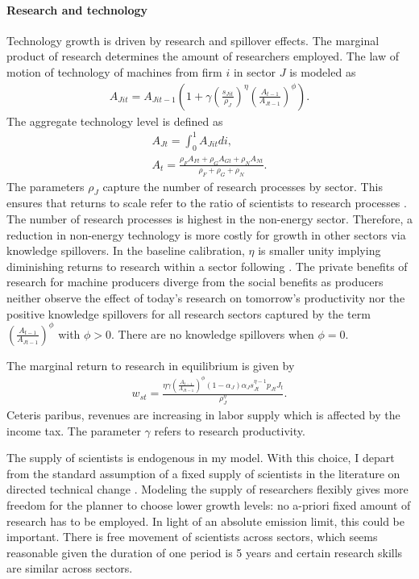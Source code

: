 \paragraph{Research and technology}
Technology growth is driven by research and spillover effects. The marginal product of research determines the amount of researchers employed.
The law of motion of technology of machines from firm $i$ in sector $J$ is modeled as
\begin{align}
A_{Jit}=A_{Jit-1}\left(1+\gamma\left(\frac{s_{Jit}}{\rho_J}\right)^\eta\left(\frac{A_{t-1}}{A_{Jt-1}}\right)^\phi\right).
\end{align}
The aggregate technology level is defined as
\begin{align}
A_{Jt}=\int_{0}^{1}A_{Jit}di,\\
A_{t}=\frac{\rho_FA_{Ft}+\rho_GA_{Gt}+\rho_N A_{Nt}}{\rho_F+\rho_G+\rho_N}.
\end{align}
The parameters $\rho_J$ capture the number of research processes by sector. This ensures that returns to scale refer to the ratio of scientists to research processes \citep{Fried2018ClimateAnalysis}. 
The number of research processes is highest in the non-energy sector. Therefore, a reduction in non-energy technology is more costly for growth in other sectors via knowledge spillovers. 
In the baseline calibration, $\eta$ is smaller unity implying diminishing returns to research within a sector following \cite{Fried2018ClimateAnalysis}. 
The private benefits of research for machine producers diverge from the social benefits as  producers neither observe the effect of today's research on tomorrow's productivity nor the positive knowledge spillovers for all research sectors captured by the term $\left(\frac{A_{t-1}}{A_{Jt-1}}\right)^\phi$ with $\phi>0$. There are no knowledge spillovers when $\phi=0$.

The marginal return to research in equilibrium is  given by
\begin{align}
w_{st}= \frac{\eta \gamma \left(\frac{A_{t-1}}{A_{Jt-1}}\right)^\phi (1-\alpha_J)\alpha_Js_{Jt}^{\eta-1}p_{Jt}J_t}{\rho_J^\eta}.
\end{align}
Ceteris paribus, revenues are increasing in labor supply which is affected by the income tax. The parameter $\gamma$ refers to research productivity.

The supply of scientists is endogenous in my model. With this choice, I depart from the standard assumption of a fixed supply of scientists in the literature on directed technical change \citep{Acemoglu2012TheChange, Fried2018ClimateAnalysis}.  Modeling the supply of researchers flexibly gives more freedom for the planner to choose lower growth levels: no a-priori fixed amount of research has to be employed. In light of an absolute emission limit, this could be important.
There is free movement of scientists across sectors, which seems reasonable given the duration of one period is 5 years and certain research skills are similar across sectors. %

